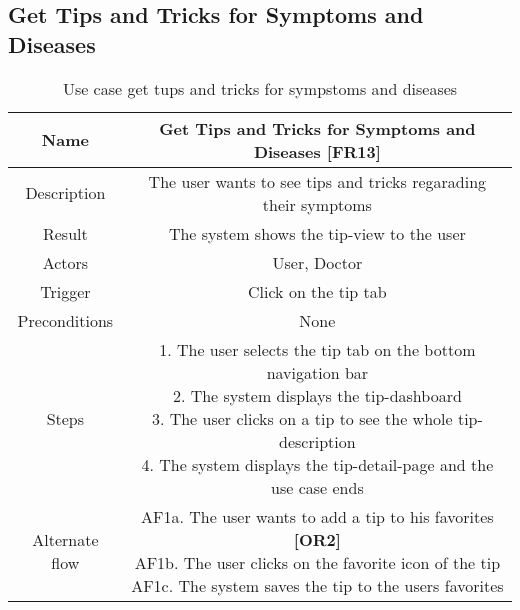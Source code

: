 \subsection{Get Tips and Tricks for Symptoms and Diseases}
\begin{table}[H]
	\begin{center}\scriptsize
		\def\arraystretch{2}%
		\begin{tabular}{ |c|c| } 
			\hline
			Name & Get Tips and Tricks for Symptoms and Diseases \textbf{[FR13]}\\
			\hline	
			Description & The user wants to see tips and tricks regarading their symptoms \\ 
			\hline
			Result & The system shows the tip-view to the user\\ 
			\hline
			Actors & User, Doctor \\ 
			\hline
			Trigger & Click on the tip tab\\ 
			\hline
			Preconditions & None \\ 
			\hline
			Steps & \parbox{9cm}{\vspace{.5\baselineskip}
				1. The user selects the tip tab on the bottom navigation bar\\
				2. The system displays the tip-dashboard\\
				3. The user clicks on a tip to see the whole tip-description\\
				4. The system displays the tip-detail-page and the use case ends}\\
			\hline
			Alternate flow & \parbox{9cm}{\vspace{.5\baselineskip} 
				AF1a. The user wants to add a tip to his favorites \textbf{[OR2]}\\
				AF1b. The user clicks on the favorite icon of the tip\\
				AF1c. The system saves the tip to the users favorites }\\
			\hline
		\end{tabular}\normalsize
	\end{center}
	\caption{Use case get tups and tricks for sympstoms and diseases}
\end{table}



